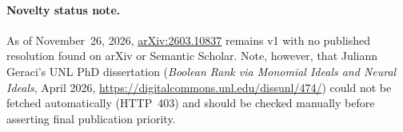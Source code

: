 \documentclass[11pt]{article}
\theoremstyle{plain}
\theoremstyle{definition}
\theoremstyle{remark}
\begin{document}
\paragraph{Novelty status note.}
As of November~26, 2026, \href{https://arxiv.org/abs/2603.10837}{arXiv:2603.10837} remains v1 with no published resolution found on arXiv or Semantic Scholar. Note, however, that Juliann Geraci's UNL PhD dissertation (\emph{Boolean Rank via Monomial Ideals and Neural Ideals}, April 2026, \url{https://digitalcommons.unl.edu/dissunl/474/}) could not be fetched automatically (HTTP~403) and should be checked manually before asserting final publication priority.
\end{document}
